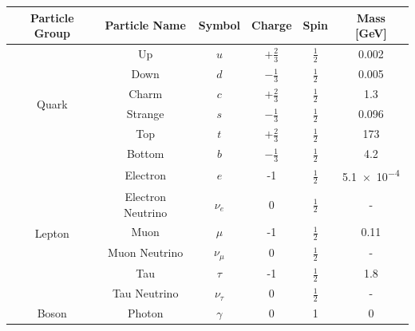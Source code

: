 \vspace{-0.5em}
  {\renewcommand{\arraystretch}{1.3}
  \begin{table}[!ht]
  \begin{center}
    \begin{tabular}{|c|c||c|c|c|c|}
      \hline
    Particle Group          & Particle Name   & Symbol        & Charge  &  Spin  &  Mass [GeV]\\
    \hline
    \multirow{6}{*}{Quark}  &Up            &   $u$  &  $+\frac{2}{3}$   &  $\frac{1}{2}$  &  0.002\\
                            &Down          &   $d$  &  $-\frac{1}{3}$   &  $\frac{1}{2}$  &  0.005\\
                            \cline{2-6}                                            
                            &Charm         &   $c$  &  $+\frac{2}{3}$   &  $\frac{1}{2}$  &  1.3 \\
                            &Strange       &   $s$  &  $-\frac{1}{3}$   &  $\frac{1}{2}$  &  0.096 \\
                            \cline{2-6}                                                      
                            &Top           &   $t$  &  $+\frac{2}{3}$   &  $\frac{1}{2}$  &  173  \\
                            &Bottom        &   $b$  &  $-\frac{1}{3}$   &  $\frac{1}{2}$  &  4.2  \\
    \hline                  
    \multirow{6}{*}{Lepton} &Electron          &   $e$         &  -1    &  $\frac{1}{2}$   &  \num{5.1e-4}\\
                            &Electron Neutrino &   $\nu_e$     &  0     &  $\frac{1}{2}$   &  -\\
                            \cline{2-6}                                   
                            &Muon              &   $\mu$       &  -1    &  $\frac{1}{2}$   &  0.11 \\
                            &Muon Neutrino     &   $\nu_{\mu}$  &  0     &  $\frac{1}{2}$   &  -\\
                            \cline{2-6}                                      
                            &Tau               &   $\tau$       &  -1   &  $\frac{1}{2}$   &  1.8\\
                            &Tau Neutrino      &   $\nu_{\tau}$  &  0    &  $\frac{1}{2}$   &  -\\
    \hline
    \multirow{5}{*}{Boson}  &Photon           &   $\gamma$    &  0      &  1     &  0 \\

\end{tabular}
\end{center}
\end{table}}
